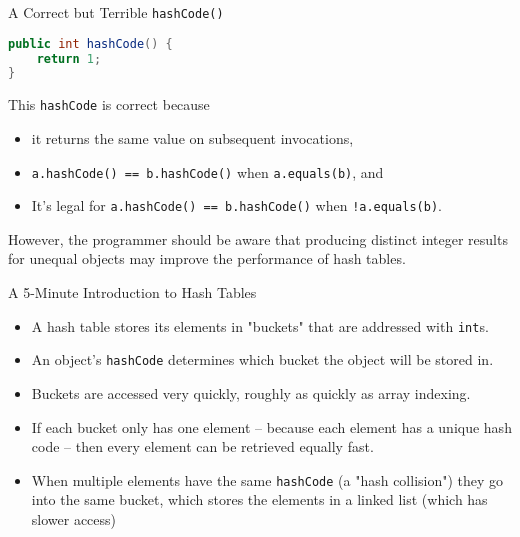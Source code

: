 \documentclass{beamer}
\begin{document}
\begin{frame}[fragile]{A Correct but Terrible {\tt hashCode()}}

\begin{lstlisting}[language=Java]
public int hashCode() {
    return 1;
}
\end{lstlisting}
This {\tt hashCode} is correct because
\begin{itemize}
\item it returns the same value on subsequent invocations,
\item {\tt a.hashCode() == b.hashCode()} when {\tt a.equals(b)}, and
\item It's legal for {\tt a.hashCode() == b.hashCode()} when {\tt !a.equals(b)}.
\end{itemize}
However, the programmer should be aware that producing distinct integer results for unequal objects may improve the performance of hash tables.

\end{frame}

\begin{frame}[fragile]{A 5-Minute Introduction to Hash Tables}

\begin{itemize}
\item A hash table stores its elements in "buckets" that are addressed with {\tt int}s.
\item An object's {\tt hashCode} determines which bucket the object will be stored in.
\item Buckets are accessed very quickly, roughly as quickly as array indexing.
\item If each bucket only has one element -- because each element has a unique hash code -- then every element can be retrieved equally fast.
\item When multiple elements have the same {\tt hashCode} (a "hash collision") they go into the same bucket, which stores the elements in a linked list (which has slower access)
\end{itemize}

\end{frame}
\end{document}
